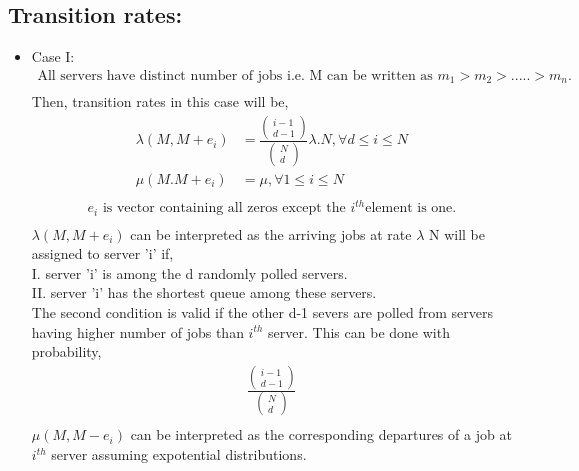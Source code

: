 \documentclass[a4paper,english,12pt]{article}
\begin{document}
\subsection{Transition rates:}
\begin{itemize}
\item{Case I: }
\begin{align*}
\text{All servers have distinct number of jobs i.e. M can be written as }  m_1   > m_2 > ..... > m_n.\\
\end{align*}
Then, transition rates in this case will be,\\
\begin{align*}
\lambda(M,M+e_i)&=\frac{\begin{pmatrix} i-1 \\ d-1 \end{pmatrix}}{\begin{pmatrix} N \\ d \end{pmatrix}}\lambda.N ,\forall d \le i \le N \\
\mu(M.M+e_i)&= \mu , \forall 1\le i \le N\\
\end{align*}
\begin{align*}
e_i \text { is vector containing all zeros except the  }  i^{th} \text {element is one.}\\
\end{align*}
$\lambda(M,M+e_i)$ can be interpreted as the arriving jobs at rate  $\lambda$ N  will be assigned to server 'i' if,\\
I. server  'i' is among the d randomly polled servers.\\
II. server 'i' has the shortest queue among these servers.\\
 The second condition is valid if the other d-1 severs are polled from servers having higher number of jobs than $i^{th}$   server. 
This can be done with probability,
\begin{align*}
 \frac{\begin{pmatrix} i-1 \\ d-1 \end{pmatrix}}{\begin{pmatrix} N \\ d \end{pmatrix}}\\
\end{align*}
$\mu(M,M-e_i)$ can be interpreted as the corresponding departures of a job at $ i^{th}$ server assuming expotential distributions.\\ 


\end{itemize}
\end{document}
